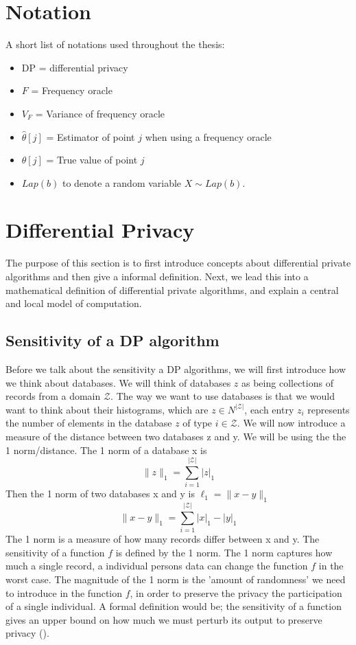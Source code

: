\documentclass[11pt]{article}
\theoremstyle{definition}
\begin{document}
\section{Notation}
A short list of notations used throughout the thesis:
\begin{itemize}
\item DP = differential privacy
\item $F$ = Frequency oracle
\item $V_{F}$ = Variance of frequency oracle
\item $\hat{\theta}[j]$ = Estimator of point $j$ when using a frequency oracle
\item $\theta[j]$ = True value of point $j$ 
\item $Lap(b)$ to denote a random variable $X\sim Lap(b)$.

\end{itemize}

\section{Differential Privacy}
The purpose of this section is to first introduce concepts about differential private algorithms and then give a informal definition. Next, we lead this into a mathematical definition of differential private algorithms, and explain a central and local model of computation. 
\subsection{Sensitivity of a DP algorithm}
Before we talk about the sensitivity a DP algorithms, we will first introduce how we think about databases.
We will think of databases $z$ as being collections of records from a domain $\mathcal{Z}$. The way we want to use databases is that we would want to think about their histograms, which are $z\in N^{|\mathcal{Z}|} $, each entry $z_i$ represents the number of elements in the database $z$ of type $i\in \mathcal{Z}$. We will now introduce a measure of the distance between two databases z and y. We will be using the the 1 norm/distance. The 1 norm of a database x is 
\[\lVert z \rVert_1 = \sum_{i=1}^{|\mathcal{Z}|} | z |_1\]
Then the 1 norm of two databases x and y is $\ell_1 = \lVert x-y \rVert_1$
\[\lVert x-y \rVert_1 = \sum_{i=1}^{|\mathcal{Z}|} | x |_1-| y |_1\]
The 1 norm is a measure of how many records differ between x and y. The sensitivity of a function $f$ is defined by the 1 norm. The 1 norm captures how much a single record, a individual persons data can change the function $f$ in the worst case. The magnitude of the 1 norm is the 'amount of randomness' we need to introduce in the function $f$, in order to preserve the privacy the participation of a single individual. A formal definition would be; the sensitivity of a function gives an upper bound on how much we must perturb its output to preserve privacy (\cite[17]{algo_fun}).
\end{document}
